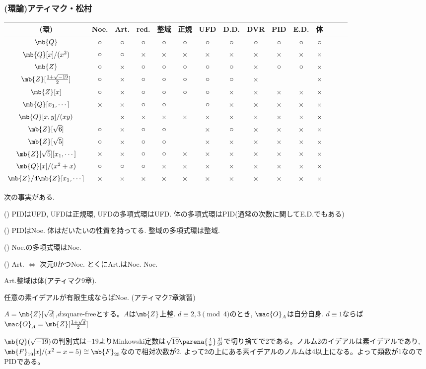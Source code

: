 \subsubsection{(環論)アティマク・松村}
{\small
\begin{tabular}{|c||c|c|c|c|c|c|c|c|c|c|c|c|c|c|}\hline
    (環)  &Noe.& Art. &red. & 整域 & 正規 & UFD &D.D. &DVR & PID  & E.D. & 体 \\ \hline 
    $\mb{Q}$ &○&○&○&○&○&○&○&○&○&○&○\\ \hline
    $\mb{Q}[x]/(x^2)$ &○&○&×&×&×&×&×&×&×&×&×\\ \hline
     $\mb{Z}$&○&×&○&○&○&○&○&×&○&○& × \\ \hline 
     $\mb{Z}[\frac{1+\sqrt{-19}}{2}]$&○&×&○&○&○&○&○&×&\aka{○}&\aka{×}&× \\ \hline
     $\mb{Z}[x]$&○&×&○&○&○&○&×&×&×&×&× \\ \hline 
     $\mb{Q}[x_1,\cdots]$ &×&×&○&○&\aka{○}&○&×&×&×&×&× \\ \hline 
      $\mb{Q}[x,y]/(xy)$&\aka{○}&×&×&×&×&×&×&×&×&×&× \\ \hline
      $\mb{Z}[\sqrt{6}]$ &○&×&○&○&\aka{○}&×&○&×&×&×&×\\ \hline
      $\mb{Z}[\sqrt{5}]$ &○&×&○&○&\aka{×}&×&×&×&×&×&×\\ \hline
      $\mb{Z}[\sqrt{5}][x_1,\cdots]$ &×&×&○&○&×&×&×&×&×&×&×\\ \hline
      $\mb{Q}[x]/(x^2+x)$ &○&○&○&×&×&×&×&×&×&×&×\\ \hline 
      $\mb{Z}/4\mb{Z}[x_1,\cdots]$ &×&×&×&×&×&×&×&×&×&×&×\\ \hline
      
\end{tabular}
}
\begin{rem}
次の事実がある.
\ben
\item () PIDはUFD,  UFDは正規環, UFDの多項式環はUFD. 体の多項式環はPID(通常の次数に関してE.D.でもある)
\item () PIDはNoe. 体はだいたいの性質を持ってる. 整域の多項式環は整域.
\item () Noe.の多項式環はNoe.
\item () Art. $\iff$ 次元0かつNoe. とくにArt.はNoe.
Noe.
\item Art.整域は体(アティマク9章).
\item 任意の素イデアルが有限生成ならばNoe. (アティマク7章演習)
\item $A=\mb{Z}[\sqrt{d}]$,$d$:square-freeとする。$A$は$\mb{Z}$上整. $d\equiv 2,3\pmod{4}$のとき, $\mac{O}_{A}$は自分自身. $d\equiv 1$ならば$\mac{O}_{A} = \mb{Z}[\frac{1+\sqrt{d}}{2}]$
\item $\mb{Q}(\sqrt{-19})$の判別式は$-19$よりMinkowski定数は$\sqrt{19}\parena{\frac{4}{\pi}}\frac{2!}{2^{2}}$で切り捨てで2である。ノルム2のイデアルは素イデアルであり, $\mb{F}_{19}[x]/(x^2-x-5)\cong \mb{F}_{25}$なので相対次数が2. よって2の上にある素イデアルのノルムは4以上になる。よって類数が1なのでPIDである。
\een
\end{rem}

